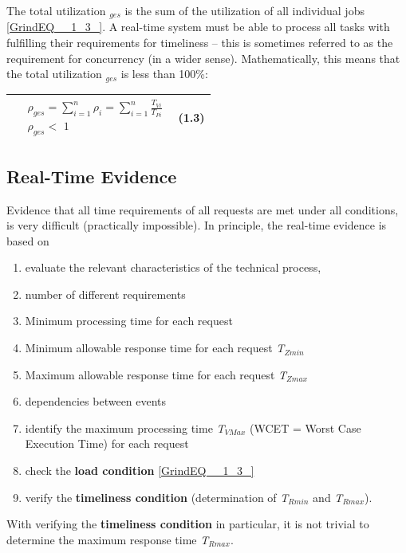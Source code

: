 The total utilization ${}_{ges}$ is the sum of the utilization of all individual jobs \eqref{GrindEQ__1_3_}. A real-time system must be able to process all tasks with fulfilling their requirements for timeliness -- this is sometimes referred to as the requirement for concurrency (in a wider sense). Mathematically, this means that the total utilization \textit{${}_{ges}$} is less than 100\%:

\begin{tabular}{|p{0.3in}|p{3.9in}|p{0.4in}|} \hline 
 & $\begin{array}{l} {\rho _{ges} =\sum _{i=1}^{n}\rho _{i} = \sum _{i=1}^{n}\frac{T_{Vi} }{T_{Pi} }  } \\ {\rho _{ges} <\, \, 1} \end{array}$ & (1.3) \\ \hline 
\end{tabular}

\subsection{  Real-Time Evidence}

Evidence that all time requirements of all requests are met under all conditions, is very difficult (practically impossible). In principle, the real-time evidence is based on

\begin{enumerate}
	\item  evaluate the relevant characteristics of the technical process,
	\item  number of different requirements
	\item  Minimum processing time for each request
	\item  Minimum allowable response time for each request \textit{T${}_{Zmin}$}
	\item  Maximum allowable response time for each request \textit{T${}_{Zmax}$}
	\item  dependencies between events
	\item  identify the maximum processing time \textit{T${}_{VMax}$} (WCET = Worst Case Execution Time) for each request
	\item  check the\textbf{ load condition} \eqref{GrindEQ__1_3_}
	\item  verify the \textbf{timeliness condition} (determination of \textit{T${}_{Rmin}$} and \textit{T${}_{Rmax}$}).
\end{enumerate}

With verifying the \textbf{timeliness condition} in particular, it is not trivial to determine the maximum response time \textit{T${}_{Rmax}$}.

